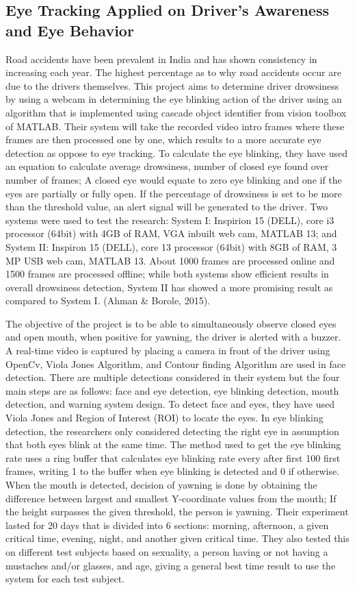 \subsection{Eye Tracking Applied  on Driver’s Awareness and Eye Behavior}
Road accidents have been prevalent in India and has shown consistency in increasing each year. The highest percentage as to why road accidents occur are due to the drivers themselves. This project aims to determine driver drowsiness by using a webcam in determining the eye blinking action of the driver using an algorithm that is implemented using cascade object identifier from vision toolbox of MATLAB. Their system will take the recorded video intro frames where these frames are then processed one by one, which results to a more accurate eye detection as oppose to eye tracking. To calculate the eye blinking, they have used an equation to calculate average drowsiness, number of closed eye found over number of frames; A closed eye would equate to zero eye blinking and one if the eyes are partially or fully open. If the percentage of drowsiness is set to be more than the threshold value, an alert signal will be generated to the driver. Two systems were used to test the research: System I: Inspirion 15 (DELL), core i3 processor (64bit) with 4GB of RAM, VGA inbuilt web cam, MATLAB 13; and System II: Inspiron 15 (DELL), core 13 processor (64bit) with 8GB of RAM, 3 MP USB web cam, MATLAB 13. About 1000 frames are processed online and 1500 frames are processed offline; while both systems show efficient results in overall drowsiness detection, System II has showed a more promising result as compared to System I. (Ahman \& Borole, 2015).
\newline

The objective of the project is to be able to simultaneously observe closed eyes and open mouth, when positive for yawning, the driver is alerted with a buzzer. A real-time video is captured by placing a camera in front of the driver using OpenCv, Viola Jones Algorithm, and Contour finding Algorithm are used in face detection. There are multiple detections considered in their system but the four main steps are as follows: face and eye detection, eye blinking detection, mouth detection, and warning system design. To detect face and eyes, they have used Viola Jones and Region of Interest (ROI) to locate the eyes. In eye blinking detection, the researchers only considered detecting the right eye in assumption that both eyes blink at the same time. The method used to get the eye blinking rate uses a ring buffer that calculates eye blinking rate every after first 100 first frames, writing 1 to the buffer when eye blinking is detected and 0 if otherwise. When the mouth is detected, decision of yawning is done by obtaining the difference between largest and smallest Y-coordinate values from the mouth; If the height surpasses the given threshold, the person is yawning. Their experiment lasted for 20 days that is divided into 6 sections: morning, afternoon, a given critical time, evening, night, and another given critical time. They also tested this on different test subjects based on sexuality, a person having or not having a mustaches and/or glasses, and age, giving a general best time result to use the system for each test subject.

